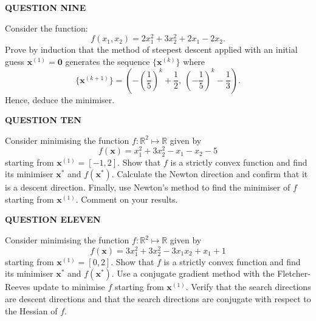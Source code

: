 \documentclass[11pt]{article}
\begin{document}
    \vspace{20pt}
    
    \Large \textbf{QUESTION NINE}

    \vspace{5pt}

    \normalsize Consider the function: $$f(x_1, x_2) = 2x_1^2+3x_2^2+2x_1-2x_2.$$Prove by induction that the method of steepest descent applied with an initial guess $\boldsymbol{x}^{(1)} = \boldsymbol{0}$ generates the sequence $\{\boldsymbol{x}^{(k)}\}$ where $$\{\boldsymbol{x}^{(k + 1)}\} = \left(-\left(\dfrac{1}{5}\right)^k+\dfrac{1}{2},~\left(-\dfrac{1}{5}\right)^k-\dfrac{1}{3}\right).$$ Hence, deduce the minimiser.

    \vspace{20pt}
    
    \Large \textbf{QUESTION TEN}

    \vspace{5pt}

    \normalsize Consider minimising the function $f: \mathbb{R}^2 \mapsto \mathbb{R}$ given by $$f(\boldsymbol{x}) = x_1^2+3x_2^2-x_1-x_2-5$$ starting from $\boldsymbol{x}^{(1)} = \left[-1, 2\right].$ Show that $f$ is a strictly convex function and find its minimiser $\boldsymbol{x}^*$ and $f(\boldsymbol{x}^*)$. Calculate the Newton direction and confirm that it is a descent direction. Finally, use Newton's method to find the minimiser of $f$ starting from $\boldsymbol{x}^{(1)}$. Comment on your results.

    \vspace{20pt}
    
    \Large \textbf{QUESTION ELEVEN}

    \vspace{5pt}

    \normalsize Consider minimising the function $f: \mathbb{R}^2 \mapsto \mathbb{R}$ given by $$f(\boldsymbol{x}) = 3x_1^2+3x_2^2-3x_1x_2+x_1+1$$ starting from $\boldsymbol{x}^{(1)} = \left[0, 2\right].$ Show that $f$ is a strictly convex function and find its minimiser $\boldsymbol{x}^*$ and $f(\boldsymbol{x}^*)$. Use a conjugate gradient method with the Fletcher-Reeves update to minimise $f$ starting from $\boldsymbol{x}^{(1)}$. Verify that the search directions are descent directions and that the search directions are conjugate with respect to the Hessian of $f$.

    \vspace{20pt}
    
\end{document}

